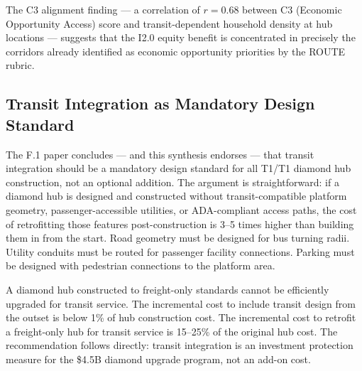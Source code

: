 The C3 alignment finding --- a correlation of $r = 0.68$ between C3 (Economic Opportunity Access) score and transit-dependent household density at hub locations \citep{ROUTE_F1} --- suggests that the I2.0 equity benefit is concentrated in precisely the corridors already identified as economic opportunity priorities by the ROUTE rubric.

\subsection{Transit Integration as Mandatory Design Standard}

The F.1 paper concludes --- and this synthesis endorses --- that transit integration should be a mandatory design standard for all T1/T1 diamond hub construction, not an optional addition. The argument is straightforward: if a diamond hub is designed and constructed without transit-compatible platform geometry, passenger-accessible utilities, or ADA-compliant access paths, the cost of retrofitting those features post-construction is 3--5 times higher than building them in from the start. Road geometry must be designed for bus turning radii. Utility conduits must be routed for passenger facility connections. Parking must be designed with pedestrian connections to the platform area.

A diamond hub constructed to freight-only standards cannot be efficiently upgraded for transit service. The incremental cost to include transit design from the outset is below 1\% of hub construction cost. The incremental cost to retrofit a freight-only hub for transit service is 15--25\% of the original hub cost. The recommendation follows directly: transit integration is an investment protection measure for the \$4.5B diamond upgrade program, not an add-on cost.
